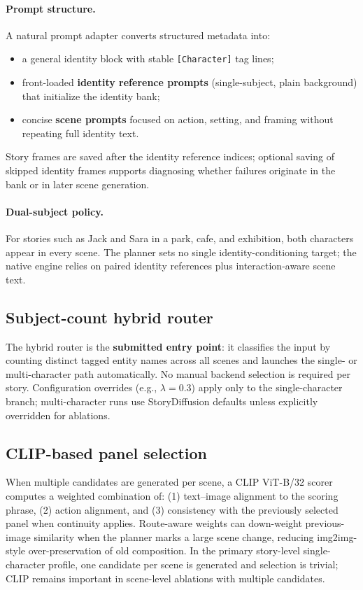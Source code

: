 \paragraph{Prompt structure.}
A natural prompt adapter converts structured metadata into:
\begin{itemize}
  \item a general identity block with stable \texttt{[Character]} tag lines;
  \item front-loaded \textbf{identity reference prompts} (single-subject, plain background) that initialize the identity bank;
  \item concise \textbf{scene prompts} focused on action, setting, and framing without repeating full identity text.
\end{itemize}
Story frames are saved after the identity reference indices; optional saving of skipped identity frames supports diagnosing whether failures originate in the bank or in later scene generation.

\paragraph{Dual-subject policy.}
For stories such as Jack and Sara in a park, cafe, and exhibition, both characters appear in every scene.
The planner sets no single identity-conditioning target; the native engine relies on paired identity references plus interaction-aware scene text.

\subsection{Subject-count hybrid router}
\label{sec:router}

The hybrid router is the \textbf{submitted entry point}: it classifies the input by counting distinct tagged entity names across all scenes and launches the single- or multi-character path automatically.
No manual backend selection is required per story.
Configuration overrides (e.g., $\lambda=0.3$) apply only to the single-character branch; multi-character runs use StoryDiffusion defaults unless explicitly overridden for ablations.

\subsection{CLIP-based panel selection}
\label{sec:clip}

When multiple candidates are generated per scene, a CLIP ViT-B/32 scorer computes a weighted combination of:
(1) text--image alignment to the scoring phrase,
(2) action alignment,
and (3) consistency with the previously selected panel when continuity applies.
Route-aware weights can down-weight previous-image similarity when the planner marks a large scene change, reducing img2img-style over-preservation of old composition.
In the primary story-level single-character profile, one candidate per scene is generated and selection is trivial; CLIP remains important in scene-level ablations with multiple candidates.

